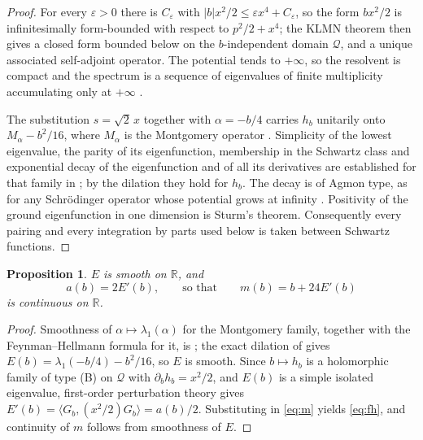 \documentclass[11pt,reqno]{amsart}
\theoremstyle{plain}
\newtheorem{proposition}[theorem]{Proposition}
\theoremstyle{definition}
\theoremstyle{remark}
\numberwithin{equation}{section}
\begin{document}
\begin{proof}
  For every $\varepsilon>0$ there is $C_\varepsilon$ with
  $|b|x^2/2\le\varepsilon x^4+C_\varepsilon$, so the form $bx^2/2$ is
  infinitesimally form-bounded with respect to $p^2/2+x^4$; the KLMN theorem
  \cite{ReedSimonII} then gives a closed form bounded below on the
  $b$-independent domain $\mathcal Q$, and a unique associated self-adjoint
  operator. The potential tends to $+\infty$, so the resolvent is compact and
  the spectrum is a sequence of eigenvalues of finite multiplicity accumulating
  only at $+\infty$ \cite{ReedSimonIV}.

  The substitution $s=\sqrt2\,x$ together with $\alpha=-b/4$ carries $h_b$
  unitarily onto $M_\alpha-b^2/16$, where $M_\alpha$ is the Montgomery
  operator \cite{montgomery1995hearing}. Simplicity of the lowest eigenvalue,
  the parity of its eigenfunction, membership in the Schwartz class and
  exponential decay of the eigenfunction and of all its derivatives are
  established for that family in \cite[Proposition 1.1]{helffer2024critical};
  by the dilation they hold for $h_b$. The decay is of Agmon type, as for any
  Schr\"odinger operator whose potential grows at infinity \cite{Agmon_Book}. Positivity of the ground eigenfunction
  in one dimension is Sturm's theorem. Consequently every pairing and every
  integration by parts used below is taken between Schwartz functions.
\end{proof}

\begin{proposition}
  \label{prop:continuity}
  $E$ is smooth on $\mathbb R$, and
  \begin{equation}
    \label{eq:fh}
    a(b)=2E'(b),
    \qquad\text{so that}\qquad
    m(b)=b+24E'(b)
  \end{equation}
  is continuous on $\mathbb R$.
\end{proposition}

\begin{proof}
  Smoothness of $\alpha\mapsto\lambda_1(\alpha)$ for the Montgomery family,
  together with the Feynman--Hellmann formula for it, is
  \cite[Proposition 2.1]{helffer2024critical}; the exact dilation of
   gives $E(b)=\lambda_1(-b/4)-b^2/16$, so $E$ is smooth.
  Since $b\mapsto h_b$ is a holomorphic family of type (B) on $\mathcal Q$
  with $\partial_bh_b=x^2/2$, and $E(b)$ is a simple isolated eigenvalue,
  first-order perturbation theory \cite{Kato_Book} gives
  $E'(b)=\langle G_b,(x^2/2)G_b\rangle=a(b)/2$. Substituting in \eqref{eq:m}
  yields \eqref{eq:fh}, and continuity of $m$ follows from smoothness of $E$.
\end{proof}
\end{document}
